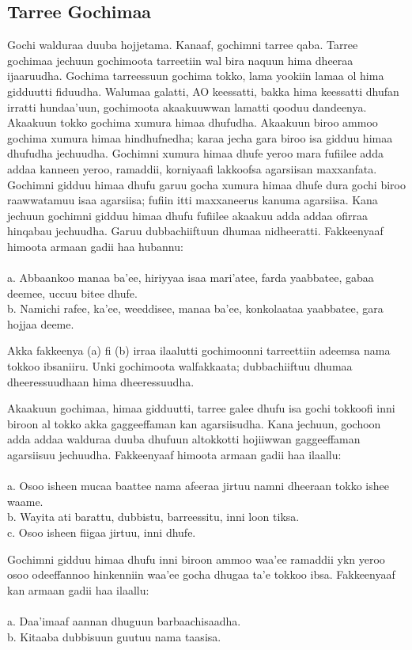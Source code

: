 \documentclass[11pt,b5paper]{book}
\begin{document}
\subsection{Tarree Gochimaa}
Gochi walduraa duuba hojjetama. Kanaaf, gochimni tarree qaba. Tarree gochimaa jechuun gochimoota tarreetiin wal bira naquun hima dheeraa ijaaruudha. Gochima tarreessuun gochima tokko, lama yookiin lamaa ol hima gidduutti fiduudha. Walumaa galatti, AO keessatti, bakka hima keessatti dhufan irratti hundaa'uun, gochimoota akaakuuwwan lamatti qooduu dandeenya. Akaakuun tokko gochima xumura himaa dhufudha. Akaakuun biroo ammoo gochima xumura himaa hindhufnedha; karaa jecha gara biroo isa gidduu himaa dhufudha jechuudha. Gochimni xumura himaa dhufe yeroo mara fufiilee adda addaa kanneen yeroo, ramaddii, korniyaafi lakkoofsa agarsiisan maxxanfata. Gochimni gidduu himaa dhufu garuu gocha xumura himaa dhufe dura gochi biroo raawwatamuu isaa agarsiisa; fufiin itti maxxaneerus kanuma agarsiisa. Kana jechuun gochimni gidduu himaa dhufu fufiilee akaakuu adda addaa ofirraa hinqabau jechuudha. Garuu dubbachiiftuun dhumaa nidheeratti. Fakkeenyaaf himoota armaan gadii haa hubannu:\\
\\
a. Abbaankoo manaa ba’ee, hiriyyaa isaa mari’atee, farda yaabbatee, gabaa deemee, uccuu bitee dhufe.\\
b. Namichi rafee, ka’ee, weeddisee, manaa ba’ee, konkolaataa yaabbatee, gara hojjaa deeme.

Akka fakkeenya (a) fi (b) irraa ilaalutti gochimoonni tarreettiin adeemsa nama tokkoo ibsaniiru. Unki gochimoota walfakkaata; dubbachiiftuu dhumaa dheeressuudhaan hima dheeressuudha.

Akaakuun gochimaa, himaa gidduutti, tarree galee dhufu isa gochi tokkoofi inni biroon al tokko akka gaggeeffaman kan agarsiisudha. Kana jechuun, gochoon adda addaa walduraa duuba dhufuun altokkotti hojiiwwan gaggeeffaman agarsiisuu jechuudha. Fakkeenyaaf himoota armaan gadii haa ilaallu: \\
\\
a. Osoo isheen mucaa baattee nama afeeraa jirtuu namni dheeraan tokko ishee waame.\\
b. Wayita ati barattu, dubbistu, barreessitu, inni loon tiksa.\\
c. Osoo isheen fiigaa jirtuu, inni dhufe.

Gochimni gidduu himaa dhufu inni biroon ammoo waa'ee ramaddii ykn yeroo osoo odeeffannoo hinkenniin waa'ee gocha
dhugaa ta’e tokkoo ibsa. Fakkeenyaaf kan armaan gadii haa ilaallu: \\
\\
a. Daa’imaaf aannan dhuguun barbaachisaadha.\\
b. Kitaaba dubbisuun guutuu nama taasisa.
\end{document}

